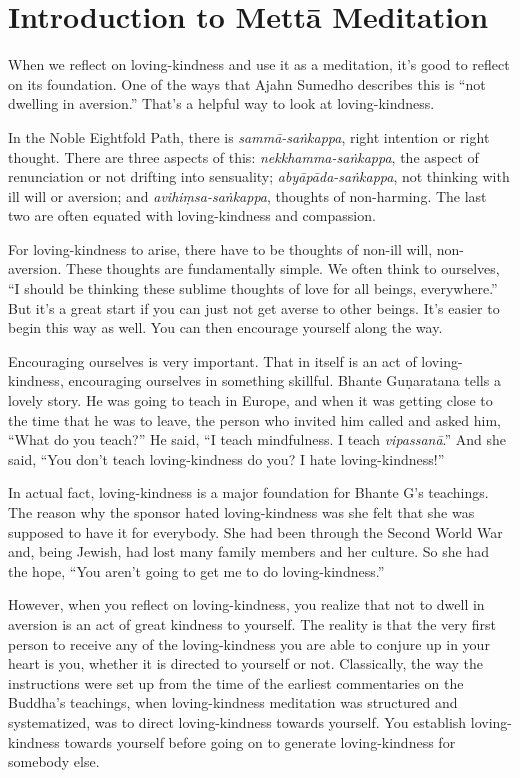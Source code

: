 \chapter{Introduction to Mettā
Meditation}

When we reflect on loving-kindness and use it as a meditation, it’s good
to reflect on its foundation. One of the ways that Ajahn Sumedho
describes this is “not dwelling in aversion.” That’s a helpful way to
look at loving-kindness.

In the Noble Eightfold Path, there is \emph{sammā-saṅkappa}, right
intention or right thought. There are three aspects of this:
\emph{nekkhamma-saṅkappa}, the aspect of renunciation or not drifting
into sensuality; \emph{abyāpāda-saṅkappa}, not thinking with ill will or
aversion; and \emph{avihiṃsa-saṅkappa}, thoughts of non-harming. The
last two are often equated with loving-kindness and compassion.

For loving-kindness to arise, there have to be thoughts of non-ill will,
non-aversion. These thoughts are fundamentally simple. We often think to
ourselves, “I should be thinking these sublime thoughts of love for all
beings, everywhere.” But it’s a great start if you can just not get
averse to other beings. It’s easier to begin this way as well. You can
then encourage yourself along the way.

Encouraging ourselves is very important. That in itself is an act of
loving-kindness, encouraging ourselves in something skillful. Bhante
Guṇaratana tells a lovely story. He was going to teach in Europe, and
when it was getting close to the time that he was to leave, the person
who invited him called and asked him, “What do you teach?” He said, “I
teach mindfulness. I teach \emph{vipassanā}.” And she said, “You don’t
teach loving-kindness do you? I hate loving-kindness!”

In actual fact, loving-kindness is a major foundation for Bhante G’s
teachings. The reason why the sponsor hated loving-kindness was she felt
that she was supposed to have it for everybody. She had been through the
Second World War and, being Jewish, had lost many family members and her
culture. So she had the hope, “You aren’t going to get me to do
loving-kindness.”

However, when you reflect on loving-kindness, you realize that not to
dwell in aversion is an act of great kindness to yourself. The reality
is that the very first person to receive any of the loving-kindness you
are able to conjure up in your heart is you, whether it is directed to
yourself or not. Classically, the way the instructions were set up from
the time of the earliest commentaries on the Buddha’s teachings, when
loving-kindness meditation was structured and systematized, was to
direct loving-kindness towards yourself. You establish loving-kindness
towards yourself before going on to generate loving-kindness for
somebody else.

